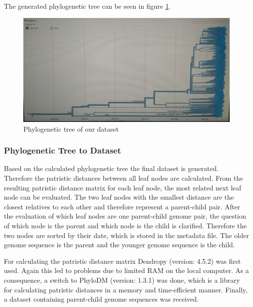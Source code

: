 The generated phylogenetic tree can be seen in figure \ref{phylogeneticTree}.

\begin{figure}[ht]
	\centering
	\includegraphics[width=1.0\linewidth]{figures/phylogeneticTree.jpg}
	\caption{Phylogenetic tree of our dataset \cite{own representation}}
	\label{phylogeneticTree}
\end{figure}

\subsubsection{Phylogenetic Tree to Dataset} \label{approachAc}

Based on the calculated phylogenetic tree the final dataset is generated. Therefore the patristic distances between all leaf nodes are calculated. From the resulting patristic distance matrix for each leaf node, the most related next leaf node can be evaluated. The two leaf nodes with the smallest distance are the closest relatives to each other and therefore represent a parent-child pair. After the evaluation of which leaf nodes are one parent-child genome pair, the question of which node is the parent and which node is the child is clarified. Therefore the two nodes are sorted by their date, which is stored in the metadata file. The older genome sequence is the parent and the younger genome sequence is the child.

For calculating the patristic distance matrix Dendropy (version: 4.5.2) \cite{DendroPyPhylogeneticComputing} was first used. Again this led to problems due to limited RAM on the local computer. As a consequence, a switch to PhyloDM (version: 1.3.1) \cite{aaron_mussig_2020_4089111} was done, which is a library for calculating patristic distances in a memory and time-efficient manner. Finally, a dataset containing parent-child genome sequences was received.

